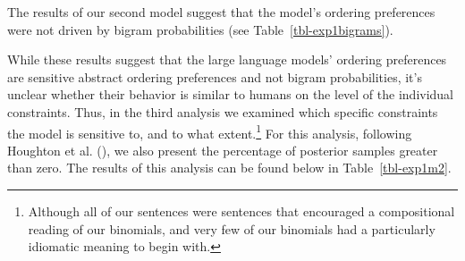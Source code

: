 \documentclass[
  12pt,
  letterpaper,
]{scrreprt}
\begin{document}
The results of our second model suggest that the model's ordering
preferences were not driven by bigram probabilities (see
Table~\ref{tbl-exp1bigrams}).

\begin{table}

\caption{\label{tbl-exp1bigrams}Model results examining the effect of
AbsPref and Bigram Probabilities on LogOdds(AandB).}


\end{table}%

While these results suggest that the large language models' ordering
preferences are sensitive abstract ordering preferences and not bigram
probabilities, it's unclear whether their behavior is similar to humans
on the level of the individual constraints. Thus, in the third analysis
we examined which specific constraints the model is sensitive to, and to
what extent.\footnote{Although all of our sentences were sentences that
  encouraged a compositional reading of our binomials, and very few of
  our binomials had a particularly idiomatic meaning to begin with.} For
this analysis, following Houghton et al.
(),
we also present the percentage of posterior samples greater than zero.
The results of this analysis can be found below in
Table~\ref{tbl-exp1m2}.
\end{document}
